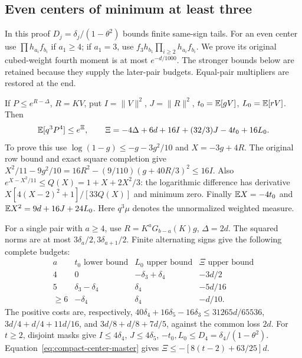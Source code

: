 \subsection{Even centers of minimum at least three}\label{loc:S37}
In this proof $D_j=\delta_{j}/(1-\theta^2)$ bounds finite same-sign tails.
For an even center use $\prod h_{a_i}f_{b_i}$ if $a_1\ge4$;
if $a_1=3$, use $f_3h_{b_1}\prod_{i\ge2}h_{a_i}f_{b_i}$.
We prove its original cubed-weight fourth moment is at most $e^{-d/1000}$.
The stronger bounds below are retained because they supply the later-pair
budgets. Equal-pair multipliers are restored at the end.

If $P\le e^{R-\Delta}$, $R=KV$, put
$I=\|V\|^2$, $J=\|R\|^2$, $t_0=\mathbb E[gV]$, $L_0=\mathbb E[rV]$.
Then
\begin{equation}\label{eq:compact-center-master}
 \mathbb E[q^3P^4]\le e^\Xi,\qquad
 \Xi=-4\Delta+6d+16I+(32/3)J-4t_0+16L_0.
\end{equation}
To prove this use $\log(1-g)\le-g-3g^2/10$ and $X=-3g+4R$.
The original row bound and exact square completion give
$X^2/11-9g^2/10=16R^2-(9/110)(g+40R/3)^2\le16I$.
Also $e^{X-X^2/11}\le Q(X)=1+X+2X^2/3$:
the logarithmic difference has derivative
$X[4(X-2)^2+1]/[33Q(X)]$ and minimum zero.
Finally $\mathbb E X=-4t_0$ and $\mathbb E X^2=9d+16J+24L_0$.
Here $q^3\mu$ denotes the unnormalized weighted measure.

For a single pair with $a\ge4$, use
$R=K^aG_{b-a}(K)g$, $\Delta=2d$.
The squared norms are at most $3\delta_{a}/2,3\delta_{a+1}/2$.
Finite alternating signs give the following complete budgets:
\[
\begin{array}{c|ccc}
a&t_0\text{ lower bound}&L_0\text{ upper bound}&\Xi\text{ upper bound}\\\hline
4&0&-\delta_{3}+\delta_{4}&-3d/2\\
5&\delta_{3}-\delta_{4}&\delta_{4}&-5d/16\\
\ge6&-\delta_{4}&\delta_{4}&-d/10.
\end{array}
\]
The positive costs are, respectively,
$40\delta_{4}+16\delta_{5}-16\delta_{3}\le31265d/65536$,
$3d/4+d/4+11d/16$, and $3d/8+d/8+7d/5$,
against the common loss $2d$.
For $t\ge2$, disjoint masks give
$I\le4\delta_{4}$, $J\le4\delta_{5}$, $-t_0,L_0\le D_4=\delta_{4}/(1-\theta^2)$.
Equation~\eqref{eq:compact-center-master} gives
$\Xi\le-[8(t-2)+63/25]d$.

